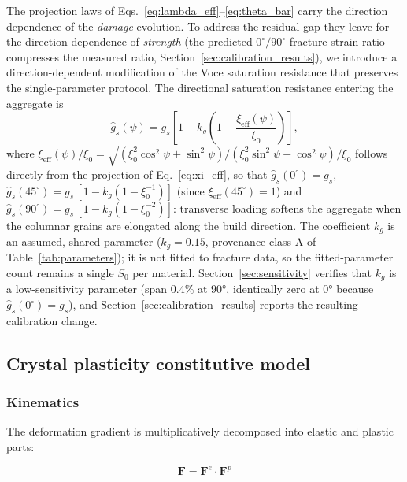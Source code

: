 \documentclass[twocolumn]{sagej}
\begin{document}
The projection laws of Eqs.~\eqref{eq:lambda_eff}--\eqref{eq:theta_bar} carry the direction dependence of the \emph{damage} evolution. To address the residual gap they leave for the direction dependence of \emph{strength} (the predicted $0^\circ/90^\circ$ fracture-strain ratio compresses the measured ratio, Section~\ref{sec:calibration_results}), we introduce a direction-dependent modification of the Voce saturation resistance that preserves the single-parameter protocol. The directional saturation resistance entering the aggregate is
\begin{equation}
\hat{g}_s(\psi) = g_s \left[1 - k_g \left(1 - \frac{\xi_{\mathrm{eff}}(\psi)}{\xi_0}\right)\right],
\label{eq:gs_directional}
\end{equation}
where $\xi_{\mathrm{eff}}(\psi)/\xi_0 = \sqrt{(\xi_0^2\cos^2\psi + \sin^2\psi)/(\xi_0^2\sin^2\psi + \cos^2\psi)}/\xi_0$ follows directly from the projection of Eq.~\eqref{eq:xi_eff}, so that $\hat{g}_s(0^\circ) = g_s$, $\hat{g}_s(45^\circ) = g_s\,[1 - k_g(1 - \xi_0^{-1})]$ (since $\xi_{\mathrm{eff}}(45^\circ) = 1$) and $\hat{g}_s(90^\circ) = g_s\,[1 - k_g(1 - \xi_0^{-2})]$: transverse loading softens the aggregate when the columnar grains are elongated along the build direction. The coefficient $k_g$ is an assumed, shared parameter ($k_g = 0.15$, provenance class A of Table~\ref{tab:parameters}); it is not fitted to fracture data, so the fitted-parameter count remains a single $S_0$ per material. Section~\ref{sec:sensitivity} verifies that $k_g$ is a low-sensitivity parameter (span 0.4\% at $\ang{90}$, identically zero at $\ang{0}$ because $\hat{g}_s(0^\circ)=g_s$), and Section~\ref{sec:calibration_results} reports the resulting calibration change.

\subsection{Crystal plasticity constitutive model}
\label{sec:cp_model}

\subsubsection{Kinematics}

The deformation gradient is multiplicatively decomposed into elastic and plastic parts:

\begin{equation}
\mathbf{F} = \mathbf{F}^e \cdot \mathbf{F}^p
\label{eq:F_decomposition}
\end{equation}
\end{document}
